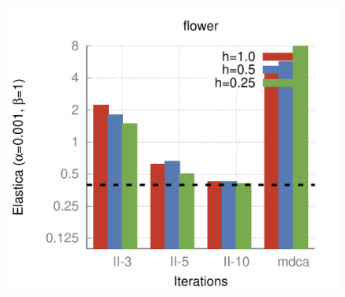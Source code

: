\begin{figure}[]
{\includegraphics[scale=0.4]{figures/chapter5/flow/plots/bars/length_pen_0.00100/flower.pdf}
}\hspace{0.25em}%
\hspace{0.25em}%
\subfloat{
}
\end{figure}
